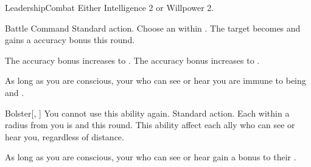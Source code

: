   \begin{feat}{Leadership}{Combat}
    \featpre Either Intelligence 2 or Willpower 2.

    \begin{activeability}{Battle Command}
      \abilityusagetime Standard action.
      \rankline
      Choose an  within \medrange.
      The target becomes \focused and gains a  accuracy bonus this round.

      \rankline
       The accuracy bonus increases to .
       The accuracy bonus increases to .
    \end{activeability}

     As long as you are conscious, your  who can see or hear you are immune to being \frightened and \panicked.

    \begin{activeability}{Bolster}[, ]
      \abilitycost You  cannot use this ability again.
      \abilityusagetime Standard action.
      \rankline
      Each  within a \largearea radius from you is \empowered and \steeled this round.
      \rankline
       This ability affect each ally who can see or hear you, regardless of distance.
    \end{activeability}

     As long as you are conscious, your  who can see or hear gain a  bonus to their .
  \end{feat}

